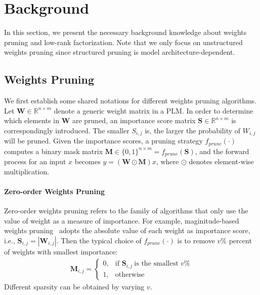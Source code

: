 \section{Background}
In this section, we present the necessary background knowledge about weights pruning and low-rank factorization. Note that we only focus on unstructured weights pruning since structured pruning is model architecture-dependent.
\subsection{Weights Pruning}
\label{sec:pruning}
We first establish some shared notations for different weights pruning algorithms. 
Let $\bm{W}\in \mathbb{R}^{n\times m}$ denote a generic weight matrix in a PLM. In order to determine which elements in $\bm{W}$ are pruned, an importance score matrix $\bm{S}\in \mathbb{R}^{n\times m}$ is correspondingly introduced. The smaller $S_{i,j}$ is, the larger the probability of $W_{i,j}$ will be pruned. Given the importance scores, a pruning strategy $f_{prune}(\cdot)$ computes a binary mask matrix $\bm{M}\in \{0,1\}^{n\times m}=f_{prune}(\bm{S})$, 
and the forward process for an input $x$ becomes $y=(\bm{W}\odot\bm{M})x$, 
where $\odot$ denotes element-wise multiplication.

\paragraph{Zero-order Weights Pruning} Zero-order weights pruning refers to the family of algorithms that only use the value of weight as a measure of importance.
For example, maginitude-based weights pruning~\cite{mag,chen2020lottery} adopts the absolute value of each weight as importance score, i.e., 
$\bm{S}_{i, j}=|\bm{W}_{i, j}|$. Then the typical choice of $f_{prune}(\cdot)$ is to remove $v\%$ percent of weights with smallest importance:
\begin{align}
	\bm{M}_{i,j}=
	\begin{cases} 
		0, & \text{if }\bm{S}_{i,j}~\text{is the smallest }v\%\\
		1,  & \text{otherwise}  
	\end{cases}
	\label{eq:zero}
\end{align}
Different sparsity can be obtained by varying $v$.

